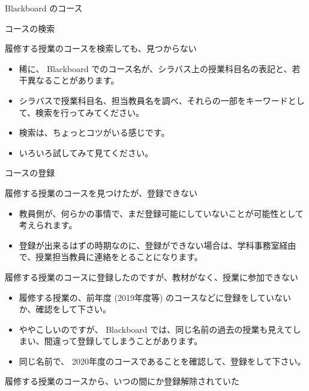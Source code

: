 \documentclass[a4j,10pt]{jsarticle}
\begin{document}
{\newpage\clearpage
{}%
\begin{frame}[label={sec:org4d8bc57},fragile]{Blackboard のコース}
\begin{block}{コースの検索}
\begin{block}{履修する授業のコースを検索しても、見つからない}
\begin{itemize}
\item 稀に、 Blackboard でのコース名が、シラバス上の授業科目名の表記と、若干異なることがあります。
\item シラバスで授業科目名、担当教員名を調べ、それらの一部をキーワードとして、検索を行ってみてください。
\item 検索は、ちょっとコツがいる感じです。
\item いろいろ試してみて見てください。
\end{itemize}
\end{block}
\end{block}
\par
\begin{block}{コースの登録}
\begin{block}{履修する授業のコースを見つけたが、登録できない}
\begin{itemize}
\item 教員側が、何らかの事情で、まだ登録可能にしていないことが可能性として考えられます。
\item 登録が出来るはずの時期なのに、登録ができない場合は、学科事務室経由で、授業担当教員に連絡をとることになります。
\end{itemize}
\end{block}
\par
\begin{block}{履修する授業のコースに登録したのですが、教材がなく、授業に参加できない}
\begin{itemize}
\item 履修する授業の、前年度 (2019年度等) のコースなどに登録をしていないか、確認をして下さい。
\item ややこしいのですが、 Blackboard では、同じ名前の過去の授業も見えてしまい、間違って登録してしまうことがあります。
\item 同じ名前で、 2020年度のコースであることを確認して、登録をして下さい。
\end{itemize}
\end{block}
\par
\begin{block}{履修する授業のコースから、いつの間にか登録解除されていた}
\begin{itemize}

\end{itemize}
\end{block}
\end{block}
\end{frame}}
\end{document}
